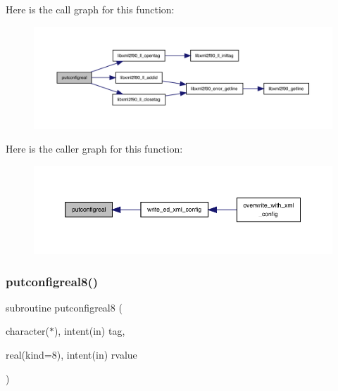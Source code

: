 Here is the call graph for this function\+:
\nopagebreak
\begin{figure}[H]
\begin{center}
\leavevmode
\includegraphics[width=350pt]{ed__xml__config_8f90_aefca40b018b8204a43d2c6822a83dee9_cgraph}
\end{center}
\end{figure}
Here is the caller graph for this function\+:
\nopagebreak
\begin{figure}[H]
\begin{center}
\leavevmode
\includegraphics[width=350pt]{ed__xml__config_8f90_aefca40b018b8204a43d2c6822a83dee9_icgraph}
\end{center}
\end{figure}
\mbox{\label{ed__xml__config_8f90_ad862c7defff292e3810aa4ee8a730a35}} 
\subsubsection{\texorpdfstring{putconfigreal8()}{putconfigreal8()}}
{\footnotesize\ttfamily subroutine putconfigreal8 (\begin{DoxyParamCaption}\item[{character($\ast$), intent(in)}]{tag,  }\item[{real(kind=8), intent(in)}]{rvalue }\end{DoxyParamCaption})}

